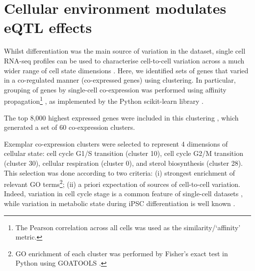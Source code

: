 


\section{Cellular environment modulates eQTL effects}

Whilst differentiation was the main source of variation in the dataset, single cell RNA-seq profiles can be used to characterise cell-to-cell variation across a much wider range of cell state dimensions \cite{buettner2015computational, buettner2017f, fan2016characterizing}. 
Here, we identified sets of genes that varied in a co-regulated manner (co-expressed genes) using clustering.
In particular, grouping of genes by single-cell co-expression was performed using affinity propagation\footnote{The Pearson correlation across all cells was used as the similarity/‘affinity’ metric.} \cite{frey2007clustering}, as implemented by the Python scikit-learn library \cite{garreta2013learning}. 
 
The top 8,000 highest expressed genes were included in this clustering
, which generated a set of 60 co-expression clusters. 

Exemplar co-expression clusters were selected to represent 4 dimensions of
cellular state: cell cycle G1/S transition (cluster
10), cell cycle G2/M transition (cluster 30), cellular respiration (cluster 0), and
sterol biosynthesis (cluster 28). 
This selection was done according to two criteria: (i) strongest enrichment of relevant GO terms\footnote{GO enrichment of each cluster was performed by Fisher’s exact test in Python using GOATOOLS \cite{klopfenstein2018goatools}.};
(ii) a priori expectation of sources of cell-to-cell variation. 
Indeed, variation in cell cycle stage is a common feature of single-cell datasets \cite{buettner2015computational}, while variation in metabolic state during iPSC differentiation is well known \cite{xu2013mitochondrial}.

